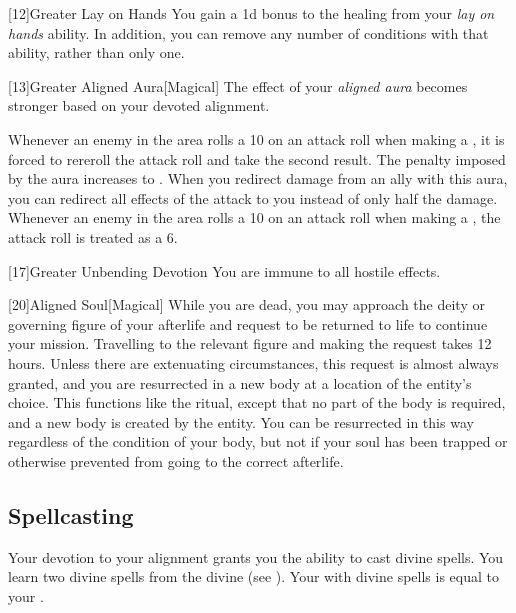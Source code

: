         [12]{Greater Lay on Hands} 
        You gain a \plus1d bonus to the healing from your \textit{lay on hands} ability.
        In addition, you can remove any number of conditions with that ability, rather than only one.

        [13]{Greater Aligned Aura}[Magical]
        The effect of your \textit{aligned aura} becomes stronger based on your devoted alignment.

         Whenever an enemy in the area rolls a 10 on an attack roll when making a , it is forced to rereroll the attack roll and take the second result.
         The penalty imposed by the aura increases to .
         When you redirect damage from an ally with this aura, you can redirect all effects of the attack to you instead of only half the damage.
         Whenever an enemy in the area rolls a 10 on an attack roll when making a , the attack roll is treated as a 6.

        [17]{Greater Unbending Devotion}
        You are immune to all hostile  effects.

        [20]{Aligned Soul}[Magical]
        While you are dead, you may approach the deity or governing figure of your afterlife and request to be returned to life to continue your mission.
        Travelling to the relevant figure and making the request takes 12 hours.
        Unless there are extenuating circumstances, this request is almost always granted, and you are resurrected in a new body at a location of the entity's choice.
        This functions like the  ritual, except that no part of the body is required, and a new body is created by the entity.
        You can be resurrected in this way regardless of the condition of your body, but not if your soul has been trapped or otherwise prevented from going to the correct afterlife.

    \subsection{Spellcasting}

        Your devotion to your alignment grants you the ability to cast divine spells.
        You learn two divine spells from the divine  (see ).
        Your  with divine spells is equal to your .

